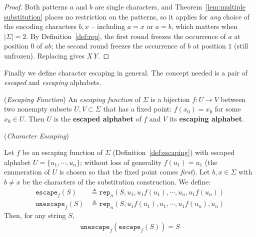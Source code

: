 \documentclass[runningheads,envcountsect]{llncs}
\begin{document}
\begin{proof}
    Both patterns $a$ and $b$ are single characters, and Theorem~\ref{lem:multiple substitution} places no restriction on the patterns, so it applies for \emph{any} choice of the encoding characters $b, x$ -- including $a = x$ or $a = b$, which matters when $|\Sigma| = 2$. By Definition~\ref{def:rep}, the first round freezes the occurrence of $a$ at position $0$ of $ab$; the second round freezes the occurrence of $b$ at position $1$ (still unfrozen). Replacing gives $X\,Y$.
\end{proof}

Finally we define character escaping in general. The concept needed is a pair of \emph{escaped} and \emph{escaping} alphabets.

\begin{definition}
    (\emph{Escaping Function})
    An \emph{escaping function} of $\Sigma$ is a bijection $f: U \rightarrow V$ between two nonempty subsets $U, V \subset \Sigma$ that has a fixed point: $f(x_0) = x_0$ for some $x_0 \in U$. Then $U$ is the \textbf{escaped alphabet} of $f$ and $V$ its \textbf{escaping alphabet}.
    \label{def:escaping}
\end{definition}

\begin{theorem}
    (\emph{Character Escaping})
    \label{thm:escape}

    Let $f$ be an escaping function of $\Sigma$ (Definition~\ref{def:escaping}) with escaped alphabet $U=\{u_1,\cdots,u_n\}$; without loss of generality $f(u_1) = u_1$ (the enumeration of $U$ is chosen so that the fixed point comes \emph{first}). Let $b, x \in \Sigma$ with $b\neq x$ be the characters of the substitution construction. We define:
    \begin{align}
        \mathtt{escape}_f(S)   & \triangleq \mathtt{rep}_n(S,u_1,u_1f(u_1),\cdots, u_n,u_1f(u_n))  \\
        \mathtt{unescape}_f(S) & \triangleq \mathtt{rep}_n(S,u_1f(u_1),u_1,\cdots, u_1f(u_n), u_n)
    \end{align}
    Then, for any string $S$,
    \begin{align}
        \mathtt{unescape}_f(\mathtt{escape}_f(S)) = S
    \end{align}
\end{theorem}
\end{document}
